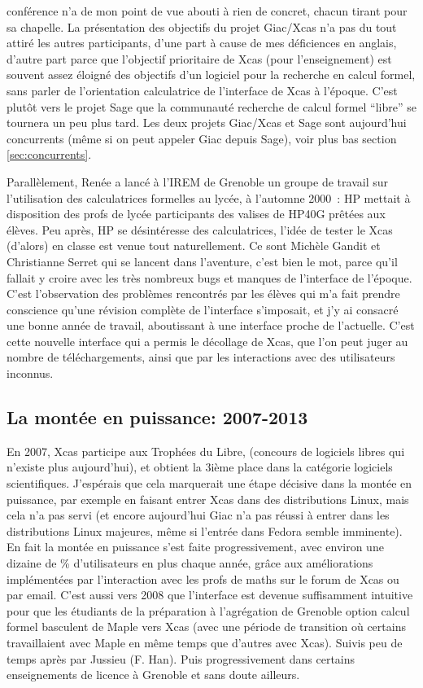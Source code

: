 \documentclass[a4paper,11pt]{article}
\begin{document}
conf\'erence n'a de mon point de vue abouti \`a rien de concret,
chacun tirant pour sa chapelle. La pr\'esentation des objectifs du projet 
Giac/Xcas n'a pas du tout attir\'e les autres participants,
d'une part \`a cause de mes d\'eficiences en anglais,
d'autre part parce que l'objectif prioritaire de Xcas (pour l'enseignement)
est souvent assez \'eloign\'e des objectifs d'un logiciel
pour la recherche en calcul formel, sans parler de l'orientation
calculatrice de l'interface de Xcas \`a l'\'epoque.
C'est plut\^ot vers le projet Sage que la
communaut\'e recherche de calcul formel ``libre'' se tournera un peu
plus tard. Les deux projets Giac/Xcas et Sage sont
aujourd'hui concurrents (m\^eme si on peut appeler Giac
depuis Sage), voir plus bas section \ref{sec:concurrents}.

Parall\`element, Ren\'ee a lanc\'e \`a l'IREM de Grenoble
un groupe de travail sur l'utilisation des calculatrices
formelles au lyc\'ee, \`a l'automne 2000~:
HP mettait \`a disposition
des profs de lyc\'ee participants des valises de HP40G
pr\^et\'ees aux \'el\`eves. Peu apr\`es, HP se d\'esint\'eresse
des calculatrices, l'id\'ee de tester le Xcas (d'alors) en classe
est venue tout naturellement. Ce sont Mich\`ele Gandit et
Christianne Serret qui se lancent dans l'aventure, c'est bien
le mot, parce qu'il fallait y croire avec les tr\`es nombreux
bugs et manques de l'interface de l'\'epoque. C'est
l'observation des probl\`emes rencontr\'es par les \'el\`eves
qui m'a fait prendre conscience qu'une r\'evision compl\`ete
de l'interface s'imposait, et j'y ai consacr\'e une bonne ann\'ee
de travail, aboutissant \`a une interface proche de l'actuelle.
C'est cette nouvelle interface qui a permis le
d\'ecollage de Xcas, que l'on peut juger
au nombre de t\'el\'echargements, ainsi que par
les interactions avec des utilisateurs inconnus.

\subsection{La mont\'ee en puissance: 2007-2013}
En 2007, Xcas participe aux Troph\'ees du Libre, (concours
de logiciels libres qui n'existe plus aujourd'hui), et obtient
la 3i\`eme place dans la cat\'egorie logiciels scientifiques.
J'esp\'erais que cela marquerait une \'etape
d\'ecisive dans la mont\'ee en puissance,
par exemple en faisant entrer Xcas dans
des distributions Linux, mais cela n'a pas servi (et encore
aujourd'hui Giac n'a pas r\'eussi \`a entrer dans les distributions
Linux majeures, m\^eme si l'entr\'ee dans Fedora semble
imminente). En fait la mont\'ee en puissance s'est faite
progressivement, avec environ une dizaine de \% d'utilisateurs
en plus chaque ann\'ee, gr\^ace aux am\'eliorations
impl\'ement\'ees par l'interaction avec les profs
de maths sur le forum de Xcas ou par email. C'est aussi
vers 2008 que l'interface est devenue suffisamment
intuitive pour que les \'etudiants de la pr\'eparation
\`a l'agr\'egation de Grenoble option calcul formel
basculent de Maple vers Xcas
(avec une p\'eriode de transition o\`u certains travaillaient
avec Maple en m\^eme temps que d'autres avec Xcas). Suivis
peu de temps apr\`es par Jussieu (F. Han). Puis progressivement
dans certains enseignements de licence \`a Grenoble et
sans doute ailleurs.
\end{document}
